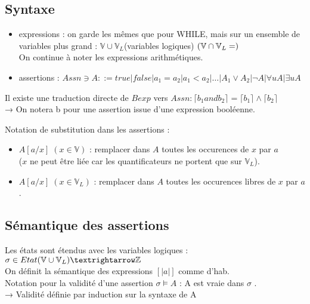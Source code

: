 \documentclass[10pt,a4paper]{article}
\newcommand{\sem}[1]{$\left[| #1 | \right]$}
\newcommand{\Vs}{\mathbb{V}}
\begin{document}
\subsection{Syntaxe}
\begin{itemize}
 \item expressions : on garde les mêmes que pour WHILE, mais sur un ensemble de variables plus grand : $\Vs \cup \Vs_L $(variables logiques) $(\Vs \cap \Vs_L = \empty)$\\
On continue à noter les expressions arithmétiques.
\item assertions : $Assn \ni A ::= true | false | a_1 = a_2 | a_1 < a_2 | \dots | A_1 \vee A_2 | \lnot A | \forall u A | \exists u A$
\end{itemize}
\begin{rem}
 Il existe une traduction directe de $Bexp$ vers $Assn : \lceil b_1 and b_2 \rceil =  \lceil b_1 \rceil \wedge \lceil b_2 \rceil$ \\
→ On notera b pour une assertion issue d'une expression booléenne.
\end{rem}
Notation de substitution dans les assertions :
\begin{itemize}
 \item $A[a/x]\; (x \in \Vs)$ : remplacer dans $A$ toutes les occurences de $x$ par $a$\\
 ($x$ ne peut être liée car les quantificateurs ne portent que sur $\Vs_L$).
 \item $A[a/x] \;(x \in \Vs_L)$ : remplacer dans $A$ toutes les occurences libres de $x$ par $a$.
\end{itemize}


\subsection{Sémantique des assertions}
Les états sont étendus avec les variables logiques :
$\sigma \in Etat (\Vs \cup \Vs_L) → \Zs$\\

On définit la sémantique des expressions \sem{a} comme d'hab.\\
Notation pour la validité d'une assertion $\sigma \models A$ : \og A est vraie dans $\sigma$ \fg.\\
→ Validité définie par induction sur la syntaxe de A
\end{document}
